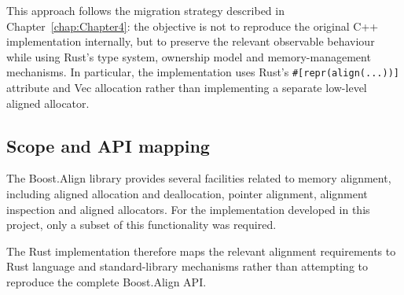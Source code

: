 This approach follows the migration strategy described in Chapter~\ref{chap:Chapter4}: the objective is not to reproduce the original C++ implementation internally, 
but to preserve the relevant observable behaviour while using Rust's type system, ownership model and memory-management mechanisms. 
In particular, the implementation uses Rust's \lstinline|#[repr(align(...))]| attribute and Vec allocation rather than 
implementing a separate low-level aligned allocator.

\subsection{Scope and API mapping}

The Boost.Align library provides several facilities related to memory alignment, including aligned allocation and deallocation, 
pointer alignment, alignment inspection and aligned allocators. For the implementation developed in this project, 
only a subset of this functionality was required.

The Rust implementation therefore maps the relevant alignment requirements to Rust language 
and standard-library mechanisms rather than attempting to reproduce the complete Boost.Align API.

